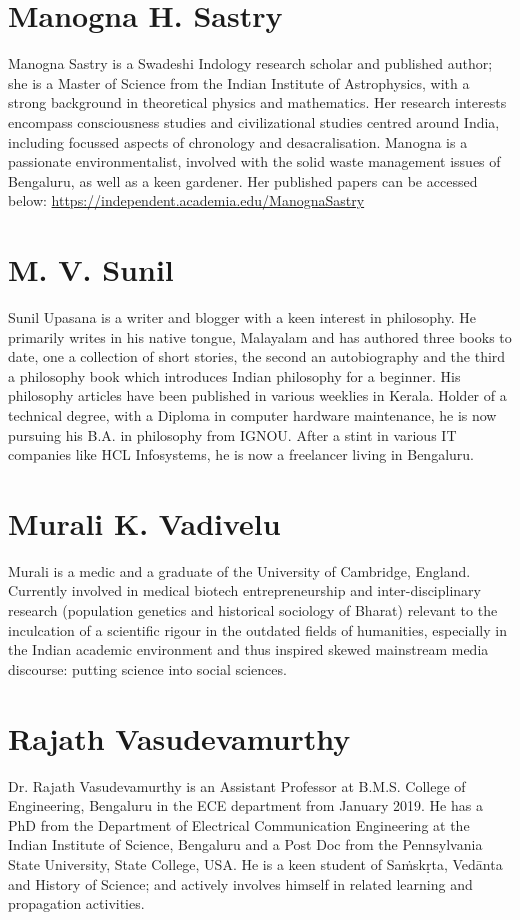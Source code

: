 \section*{Manogna H. Sastry}

Manogna Sastry is a Swadeshi Indology research scholar and published author; she is a Master of Science from the Indian Institute of Astrophysics, with a strong background in theoretical physics and mathematics. Her research interests encompass consciousness studies and civilizational studies centred around India, including focussed aspects of chronology and desacralisation. Manogna is a passionate environmentalist, involved with the solid waste management issues of Bengaluru, as well as a keen gardener. Her published papers can be accessed below: \url{https://independent.academia.edu/ManognaSastry}


\section*{M. V. Sunil}

Sunil Upasana is a writer and blogger with a keen interest in philosophy. He primarily writes in his native tongue, Malayalam and has authored three books to date, one a collection of short stories, the second an autobiography and the third a philosophy book which introduces Indian philosophy for a beginner. His philosophy articles have been published in various weeklies in Kerala. Holder of a technical degree, with a Diploma in computer hardware maintenance, he is now pursuing his B.A. in philosophy from IGNOU. After a stint in various IT companies like HCL Infosystems, he is now a freelancer living in Bengaluru.


\section*{Murali K. Vadivelu}

Murali is a medic and a graduate of the University of Cambridge, England. Currently involved in medical biotech entrepreneurship and inter-disciplinary research (population genetics and historical sociology of Bharat) relevant to the inculcation of a scientific rigour in the outdated fields of humanities, especially in the Indian academic environment and thus inspired skewed mainstream media discourse: putting science into social sciences.


\section*{Rajath Vasudevamurthy}

Dr. Rajath Vasudevamurthy is an Assistant Professor at B.M.S. College of Engineering, Bengaluru in the ECE department from January 2019. He has a PhD from the Department of Electrical Communication Engineering at the Indian Institute of Science, Bengaluru and a Post Doc from the Pennsylvania State University, State College, USA. He is a keen student of Saṁskṛta, Vedānta and History of Science; and actively involves himself in related learning and propagation activities.


